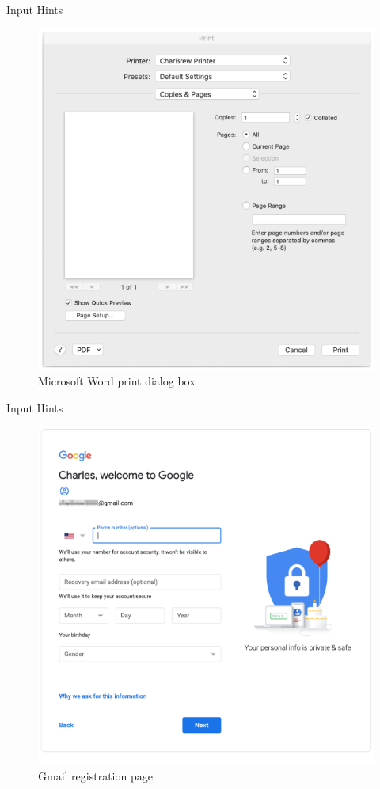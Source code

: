 \documentclass{beamer}
\begin{document}
\begin{frame}[t]{Input Hints}	
	\begin{figure}[h]
		\centering
		\includegraphics[scale=0.4]{images/lec08-pic42.png}
		\caption{Microsoft Word print dialog box}
	\end{figure}
\end{frame}

\begin{frame}[t]{Input Hints}
	\begin{figure}[h]
		\centering
		\includegraphics[scale=0.4]{images/lec08-pic43.png}
		\caption{Gmail registration page}
	\end{figure}
\end{frame}
\end{document}
